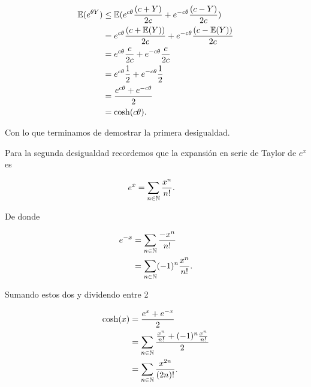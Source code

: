 \begin{align}
    \mathbb{E}(e^{\theta Y})    &\leq   \mathbb{E}(e^{c\theta} \frac{(c + Y)}{2c} + e^{-c\theta} \frac{(c - Y)}{2c})            \\
                        &=      e^{c\theta} \frac{(c + \mathbb{E}(Y))}{2c} + e^{-c\theta} \frac{(c - \mathbb{E}(Y))}{2c}        \\
                        &=      e^{c\theta} \frac{c}{2c} + e^{-c\theta} \frac{c}{2c}                            \\
                        &=      e^{c\theta} \frac{1}{2} + e^{-c\theta} \frac{1}{2}                              \\                       
                        &=      \frac{e^{c\theta} + e^{-c\theta}}{2}                                            \\
                        &=      \cosh(c \theta).
\end{align}\par\null

Con lo que terminamos de demostrar la primera desigualdad.\par\null

Para la segunda desigualdad recordemos que la expansión en serie de Taylor de $e^x$ es

\begin{align}
    e^x     &=  \sum_{n \in \mathbb{N}} \frac{x^{n}}{n!}.   \label{Expansion_de_taylor_de_e}
\end{align}\par\null

De donde 

\begin{align}
    e^{-x}  &=  \sum_{n \in \mathbb{N}} \frac{-x^{n}}{n!}           \\
            &=  \sum_{n \in \mathbb{N}} (-1)^{n}\frac{x^{n}}{n!}.   
\end{align}\par\null

Sumando estos dos y dividendo entre 2

\begin{align}
    \cosh(x)    &=  \frac{e^x + e^{-x}}{2}                                                  \\
                &=  \sum_{n \in \mathbb{N}} \frac{\frac{x^{n}}{n!} + (-1)^{n}\frac{x^{n}}{n!}}{2}   \\
                &=  \sum_{n \in \mathbb{N}} \frac{x^{2n}}{(2n)!}. \label{problema2_3:expansion_en_serie_de_taylor}
\end{align}\par\null

